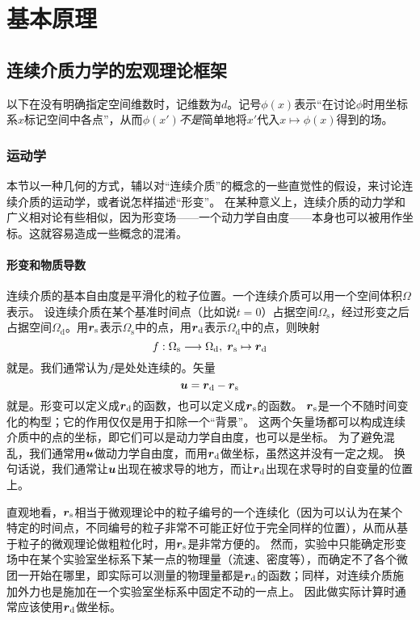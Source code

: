 \part{基本原理}

\chapter{连续介质力学的宏观理论框架}

以下在没有明确指定空间维数时，记维数为$d$。记号$\phi(x)$表示“在讨论$\phi$时用坐标系$x$标记空间中各点”，从而$\phi(x')$\emph{不是}简单地将$x'$代入$x \mapsto \phi(x)$得到的场。

\section{运动学}

本节以一种几何的方式，辅以对“连续介质”的概念的一些直觉性的假设，来讨论连续介质的运动学，或者说怎样描述“形变”。
在某种意义上，连续介质的动力学和广义相对论有些相似，因为形变场——一个动力学自由度——本身也可以被用作坐标。这就容易造成一些概念的混淆。

\subsection{形变和物质导数}

连续介质的基本自由度是平滑化的粒子位置。一个连续介质可以用一个空间体积$\Omega$表示。
设连续介质在某个基准时间点（比如说$t=0$）占据空间$\Omega_\text{s}$，经过形变之后占据空间$\Omega_\text{d}$。用$\vb*{r}_\text{s}$表示$\Omega_\text{s}$中的点，用$\vb*{r}_\text{d}$表示$\Omega_\text{d}$中的点，则映射
\[
    f: \Omega_\text{s} \longrightarrow \Omega_\text{d}, \; \vb*{r}_\text{s} \mapsto \vb*{r}_\text{d}
\]
就是。我们通常认为$f$是处处连续的。矢量
\begin{equation}
    \vb*{u} = \vb*{r}_\text{d} - \vb*{r}_\text{s}
\end{equation}
就是。形变可以定义成$\vb*{r}_\text{d}$的函数，也可以定义成$\vb*{r}_\text{s}$的函数。
$\vb*{r}_\text{s}$是一个不随时间变化的构型；它的作用仅仅是用于扣除一个“背景”。
这两个矢量场都可以构成连续介质中的点的坐标，即它们可以是动力学自由度，也可以是坐标。
为了避免混乱，我们通常用$\vb*{u}$做动力学自由度，而用$\vb*{r}_\text{d}$做坐标，虽然这并没有一定之规。
换句话说，我们通常让$\vb*{u}$出现在被求导的地方，而让$\vb*{r}_\text{d}$出现在求导时的自变量的位置上。

直观地看，$\vb*{r}_\text{s}$相当于微观理论中的粒子编号的一个连续化（因为可以认为在某个特定的时间点，不同编号的粒子非常不可能正好位于完全同样的位置），从而从基于粒子的微观理论做粗粒化时，用$\vb*{r}_\text{s}$是非常方便的。
然而，实验中只能确定形变场中在某个实验室坐标系下某一点的物理量（流速、密度等），而确定不了各个微团一开始在哪里，即实际可以测量的物理量都是$\vb*{r}_\text{d}$的函数；同样，对连续介质施加外力也是施加在一个实验室坐标系中固定不动的一点上。
因此做实际计算时通常应该使用$\vb*{r}_\text{d}$做坐标。

